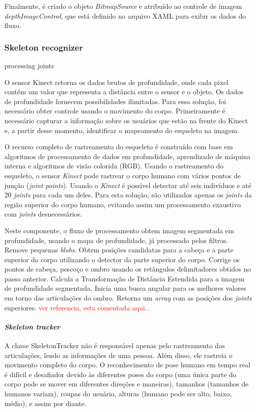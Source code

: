Finalmente, é criado o objeto \textit{BitmapSource} e atribuído ao controle de imagem \textit{depthImageControl}, que está definido no arquivo XAML para exibir os dados do fluxo.


\subsubsection{Skeleton recognizer }\label{sec:skeleton}
processing joints

O sensor Kinect retorna os dados brutos de profundidade, onde cada pixel contém um valor que representa a distância entre o sensor e o objeto. Os dados de profundidade fornecem possibilidades ilimitadas. Para essa solução, foi necessário obter controle usando o movimento do corpo. Primeiramente é necessário capturar a informação sobre os usuários que estão na frente do Kinect e, a partir desse momento, identificar o mapeamento do esqueleto na imagem.

O recurso completo de rastreamento do esqueleto é construído com base em algoritmos de processamento de dados em profundidade, aprendizado de máquina interna e algoritmos de visão colorida (RGB). Usando o rastreamento do esqueleto, o sensor \textit{Kinect} pode rastrear o corpo humano com vários pontos de junção (\textit{joint points}). Usando o \textit{Kinect} é possível detectar até seis indivíduos e até 20 \textit{joints} para cada um deles. Para esta solução, são utilizados apenas os \textit{joints} da região superior do corpo humano, evitando assim um processamento exaustivo com \textit{joints} desnecessários.

Neste componente, o fluxo de processamento obtem imagem segmentada em profundidade, usando o mapa de profundidade, já processado pelos filtros. Remove pequenas \textit{blobs}. Obtem posições candidatas para a cabeça e a parte superior do corpo utilizando o detector da parte superior do corpo. Corrige os pontos de cabeça, pescoço e ombro usando os retângulos delimitadores obtidos no passo anterior. Calcula a Transformação de Distância Estendida para a imagem de profundidade segmentada. Inicia uma busca angular para os melhores valores em torno das articulações do ombro. Retorna um \textit{array} com as posições dos \textit{joints} superiores. \textcolor{red}{ver referencia, esta comentada aqui... %
}

\paragraph{\textit{Skeleton tracker}}\label{sec:SkeletonTracker}
A classe SkeletonTracker não é responsável apenas pelo rastreamento das articulações, lendo as informações de uma pessoa. Além disso, ele rastreia o movimento completo do corpo. O reconhecimento de pose humano em tempo real é difícil e desafiador devido às diferentes poses do corpo (uma única parte do corpo pode se mover em diferentes direções e maneiras), tamanhos (tamanhos de humanos variam), roupas do usuário, alturas (humano pode ser alto, baixo, médio), e assim por diante.

